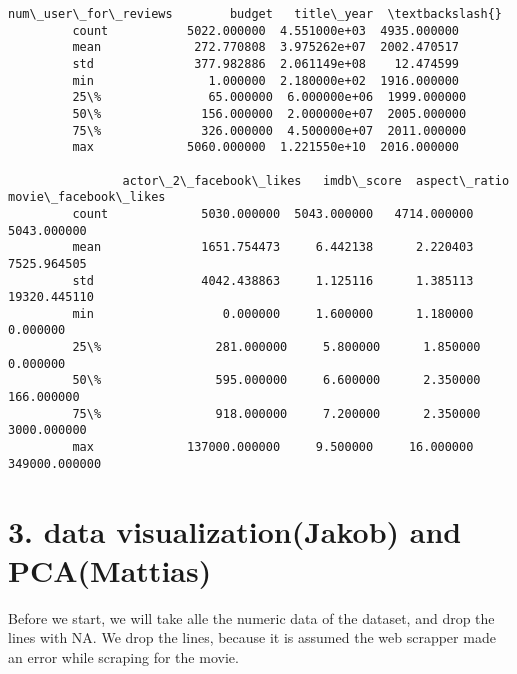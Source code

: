 \documentclass[11pt]{article}
\begin{document}
\begin{Verbatim}[commandchars=\\\{\}]
                num\_user\_for\_reviews        budget   title\_year  \textbackslash{}
         count           5022.000000  4.551000e+03  4935.000000   
         mean             272.770808  3.975262e+07  2002.470517   
         std              377.982886  2.061149e+08    12.474599   
         min                1.000000  2.180000e+02  1916.000000   
         25\%               65.000000  6.000000e+06  1999.000000   
         50\%              156.000000  2.000000e+07  2005.000000   
         75\%              326.000000  4.500000e+07  2011.000000   
         max             5060.000000  1.221550e+10  2016.000000   
         
                actor\_2\_facebook\_likes   imdb\_score  aspect\_ratio  movie\_facebook\_likes  
         count             5030.000000  5043.000000   4714.000000           5043.000000  
         mean              1651.754473     6.442138      2.220403           7525.964505  
         std               4042.438863     1.125116      1.385113          19320.445110  
         min                  0.000000     1.600000      1.180000              0.000000  
         25\%                281.000000     5.800000      1.850000              0.000000  
         50\%                595.000000     6.600000      2.350000            166.000000  
         75\%                918.000000     7.200000      2.350000           3000.000000  
         max             137000.000000     9.500000     16.000000         349000.000000  
\end{Verbatim}
        
    \section{3. data visualization(Jakob) and
PCA(Mattias)}\label{data-visualizationjakob-and-pcamattias}

    Before we start, we will take alle the numeric data of the dataset, and
drop the lines with NA. We drop the lines, because it is assumed the web
scrapper made an error while scraping for the movie.
\end{document}
